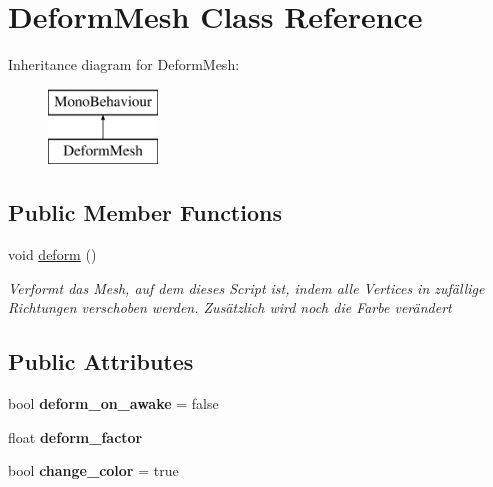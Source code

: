 \hypertarget{class_deform_mesh}{}\section{Deform\+Mesh Class Reference}
\label{class_deform_mesh}
Inheritance diagram for Deform\+Mesh\+:\begin{figure}[H]
\begin{center}
\leavevmode
\includegraphics[height=2.000000cm]{class_deform_mesh}
\end{center}
\end{figure}
\subsection*{Public Member Functions}
\begin{DoxyCompactItemize}
\item 
void \hyperlink{class_deform_mesh_ad2caad01ccc1f4bb7331ca536bff0ead}{deform} ()
\begin{DoxyCompactList}\small\item\em Verformt das Mesh, auf dem dieses Script ist, indem alle Vertices in zufällige Richtungen verschoben werden. Zusätzlich wird noch die Farbe verändert \end{DoxyCompactList}\end{DoxyCompactItemize}
\subsection*{Public Attributes}
\begin{DoxyCompactItemize}
\item 
\mbox{\label{class_deform_mesh_a8a14edf142b7aaab8b8bc939d987dbe5}} 
bool {\bfseries deform\+\_\+on\+\_\+awake} = false
\item 
\mbox{\label{class_deform_mesh_a4c5e2d7a229657017f4f9eb18fe8425f}} 
float {\bfseries deform\+\_\+factor}
\item 
\mbox{\label{class_deform_mesh_a465d3863ac58c5efc13295f25e952b39}} 
bool {\bfseries change\+\_\+color} = true
\end{DoxyCompactItemize}


